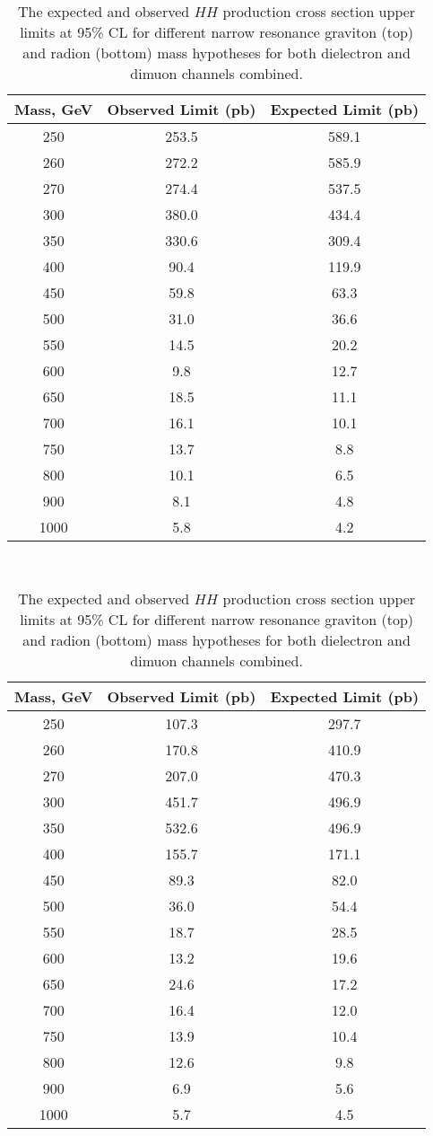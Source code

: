 \begin{table}[H]
\begin{center}
\caption[The expected and observed limits.]{The expected and observed $HH$ production cross section upper limits at 95\% CL for different
narrow resonance graviton (top) and radion (bottom) mass hypotheses for both dielectron and dimuon channels combined.}
\label{tab:finalLimits}
\begin{tabular}{|c|c|c|}
\hline
Mass, GeV & Observed Limit (pb) & Expected Limit (pb) \\
\hline
250 & 253.5 & 589.1 \\
260 & 272.2 & 585.9 \\
270 & 274.4 & 537.5 \\
300 & 380.0 & 434.4 \\
350 & 330.6 & 309.4 \\
400 & 90.4 & 119.9 \\
450 & 59.8 & 63.3 \\
500 & 31.0 & 36.6 \\
550 & 14.5 & 20.2 \\
600 & 9.8 & 12.7 \\
650 & 18.5 & 11.1 \\
700 & 16.1 & 10.1 \\
750 & 13.7 & 8.8 \\
800 & 10.1 & 6.5 \\
900 & 8.1 & 4.8 \\
1000 & 5.8 & 4.2 \\
\hline
\end{tabular}
\vspace{1 cm} \ \\
\begin{tabular}{|c|c|c|}
\hline
Mass, GeV & Observed Limit (pb) & Expected Limit (pb) \\
\hline
250 & 107.3 & 297.7 \\
260 & 170.8 & 410.9 \\
270 & 207.0 & 470.3 \\
300 & 451.7 & 496.9 \\
350 & 532.6 & 496.9 \\
400 & 155.7 & 171.1 \\
450 & 89.3 & 82.0 \\
500 & 36.0 & 54.4 \\
550 & 18.7 & 28.5 \\
600 & 13.2 & 19.6 \\
650 & 24.6 & 17.2 \\
700 & 16.4 & 12.0 \\
750 & 13.9 & 10.4 \\
800 & 12.6 & 9.8 \\
900 & 6.9 & 5.6 \\
1000 & 5.7 & 4.5 \\
\hline
\end{tabular}
\end{center}
\end{table}

